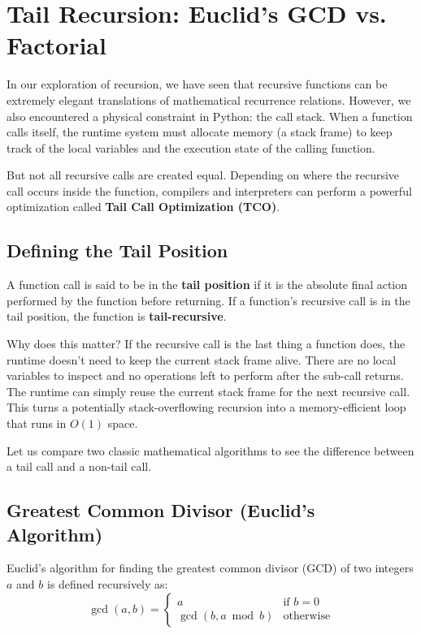 \section{Tail Recursion: Euclid's GCD vs. Factorial}
\label{sec:tail_recursion}

In our exploration of recursion, we have seen that recursive functions can be extremely elegant translations of mathematical recurrence relations. However, we also encountered a physical constraint in Python: the call stack. When a function calls itself, the runtime system must allocate memory (a stack frame) to keep track of the local variables and the execution state of the calling function.

But not all recursive calls are created equal. Depending on where the recursive call occurs inside the function, compilers and interpreters can perform a powerful optimization called \textbf{Tail Call Optimization (TCO)}. 

\subsection{Defining the Tail Position}

A function call is said to be in the \textbf{tail position} if it is the absolute final action performed by the function before returning. If a function's recursive call is in the tail position, the function is \textbf{tail-recursive}.

Why does this matter? If the recursive call is the last thing a function does, the runtime doesn't need to keep the current stack frame alive. There are no local variables to inspect and no operations left to perform after the sub-call returns. The runtime can simply reuse the current stack frame for the next recursive call. This turns a potentially stack-overflowing recursion into a memory-efficient loop that runs in $O(1)$ space.

Let us compare two classic mathematical algorithms to see the difference between a tail call and a non-tail call.

\subsection{Greatest Common Divisor (Euclid's Algorithm)}

Euclid's algorithm for finding the greatest common divisor (GCD) of two integers $a$ and $b$ is defined recursively as:
\[
\gcd(a, b) = 
\begin{cases} 
a & \text{if } b = 0 \\ 
\gcd(b, a \bmod b) & \text{otherwise} 
\end{cases}
\]

